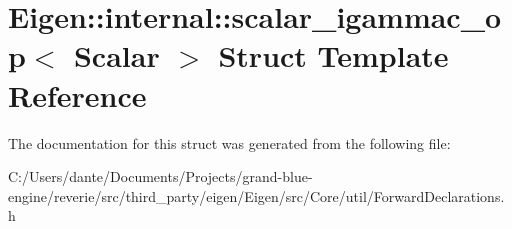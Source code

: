 \hypertarget{struct_eigen_1_1internal_1_1scalar__igammac__op}{}\section{Eigen\+::internal\+::scalar\+\_\+igammac\+\_\+op$<$ Scalar $>$ Struct Template Reference}
\label{struct_eigen_1_1internal_1_1scalar__igammac__op}


The documentation for this struct was generated from the following file\+:\begin{DoxyCompactItemize}
\item 
C\+:/\+Users/dante/\+Documents/\+Projects/grand-\/blue-\/engine/reverie/src/third\+\_\+party/eigen/\+Eigen/src/\+Core/util/Forward\+Declarations.\+h\end{DoxyCompactItemize}
